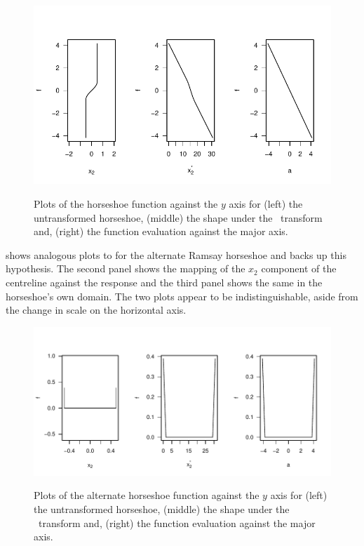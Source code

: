 \begin{figure}
\centering
\includegraphics[trim=0in 0in 0in 0in, width=6in]{sc/figs/centrelinelineplots.pdf} \\
\caption{Plots of the horseshoe function against the $y$ axis for (left) the untransformed horseshoe, (middle) the shape under the \sch\ transform and, (right) the function evaluation against the major axis.}
\label{centrelinelineplot}
\end{figure}

 shows analogous plots to  for the alternate Ramsay horseshoe and backs up this hypothesis. The second panel shows the mapping of the $x_2$ component of the centreline against the response and the third panel shows the same in the horseshoe's own domain. The two plots appear to be indistinguishable, aside from the change in scale on the horizontal axis.

\begin{figure}
\centering
\includegraphics[width=6in]{sc/figs/altcentrelinelineplots.pdf} \\
\caption{Plots of the alternate horseshoe function against the $y$ axis for (left) the untransformed horseshoe, (middle) the shape under the \sch\ transform and, (right) the function evaluation against the major axis.}
\label{altcentrelinelineplot}
\end{figure}

